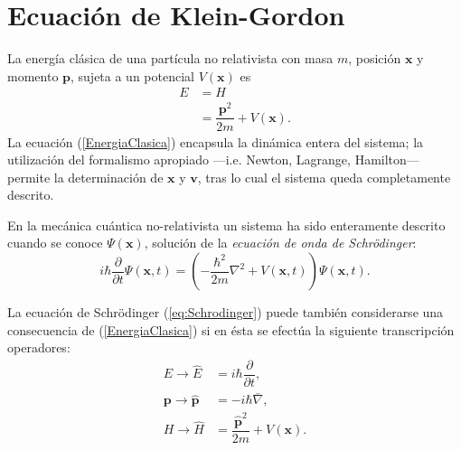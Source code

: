 \section{Ecuación de Klein-Gordon}
\label{sec:EcKleinGordon}

La energía clásica de una partícula no relativista con masa $m$, posición $\mathbf{x}$ y momento $\mathbf{p}$, sujeta a un potencial $V(\mathbf{x})$ es
\begin{equation}\label{EnergiaClasica}
\begin{array}{rl}
E&=H\\
&=\dfrac{\mathbf{p}^2}{2m}+V(\mathbf{x}).
\end{array}
\end{equation}
La ecuación (\ref{EnergiaClasica}) encapsula la dinámica entera del sistema; la utilización del formalismo apropiado ---i.e. Newton, Lagrange, Hamilton--- permite la determinación de $\mathbf{x}$ y $\mathbf{v}$, tras lo cual el sistema queda completamente descrito.\footnotemark
{}

En la mecánica cuántica no-relativista un sistema ha sido enteramente descrito cuando se conoce $\Psi(\mathbf{x})$, solución de la \textit{ecuación de onda de Schrödinger}:
\begin{equation}\label{eq:Schrodinger}
i\hbar\frac{\partial}{\partial t}\Psi(\mathbf{x},t)=\left( -\frac{\hbar^2}{2m}\nabla^2 +V(\mathbf{x},t)\right)\Psi(\mathbf{x},t).
\end{equation}

La ecuación de Schrödinger (\ref{eq:Schrodinger}) puede también considerarse una consecuencia de (\ref{EnergiaClasica}) si en ésta se efectúa la siguiente transcripción operadores:
\begin{equation}\label{eq:TransOperadores}
\begin{array}{rl}
E\rightarrow \hat{E}&=i\hbar\dfrac{\partial}{\partial t}, \\[4pt] 
\mathbf{p}\rightarrow\hat{\mathbf{p}}&=-i\hbar\bar{\nabla}, \\[3.5pt]
H\rightarrow \hat{H}&=\dfrac{\hat{\mathbf{p}}^2}{2m}+V(\mathbf{x}).\\ 
\end{array}
\end{equation}

